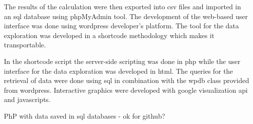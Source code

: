 The results of the calculation were then exported into csv files and imported
in an sql database using phpMyAdmin tool. The development of the web-based user interface was done using wordpress developer's platform. The tool for the data exploration was developed in a shortcode methodology
which makes it transportable.

In the shortcode script the server-side scripting was done in php while the user interface for the data exploration was developed in html. The queries for the retrieval of data were done using sql in combination with the wpdb class provided from wordpress. Interactive graphics were developed with google visualization api and javascripts.

PhP with data saved in sql databases - ok for github?